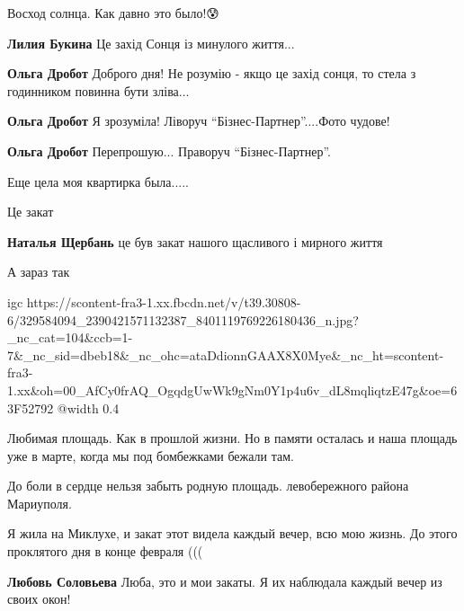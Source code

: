 Восход солнца. Как давно это было!😰

\begin{itemize} %
\textbf{Лилия Букина} Це захід Сонця із минулого життя...

\textbf{Ольга Дробот} Доброго дня! Не розумію - якщо це захід сонця, то стела з годинником повинна бути зліва...

\textbf{Ольга Дробот} Я зрозуміла! Ліворуч \enquote{Бізнес-Партнер}....Фото чудове!

\textbf{Ольга Дробот} Перепрошую... Праворуч \enquote{Бізнес-Партнер}.
\end{itemize} %


Еще цела моя квартирка была.....


Це закат

\begin{itemize} %
\textbf{Наталья Щербань} це був закат нашого щасливого і мирного життя
\end{itemize} %


А зараз так

\ifcmt
  igc https://scontent-fra3-1.xx.fbcdn.net/v/t39.30808-6/329584094_2390421571132387_8401119769226180436_n.jpg?_nc_cat=104&ccb=1-7&_nc_sid=dbeb18&_nc_ohc=ataDdionnGAAX8X0Mye&_nc_ht=scontent-fra3-1.xx&oh=00_AfCy0frAQ_OgqdgUwWk9gNm0Y1p4u6v_dL8mqliqtzE47g&oe=63F52792
	@width 0.4
\fi


Любимая площадь. Как в прошлой жизни. Но в памяти осталась и наша площадь уже в марте, когда мы под бомбежками бежали там.


До боли в сердце нельзя забыть родную площадь. левобережного района Мариуполя.


Я жила на Миклухе, и закат этот видела каждый вечер, всю мою жизнь. До этого
проклятого дня в конце февраля (((

\begin{itemize} %
\textbf{Любовь Соловьева} Люба, это и мои закаты. Я их наблюдала каждый вечер из своих окон!
\end{itemize} %

